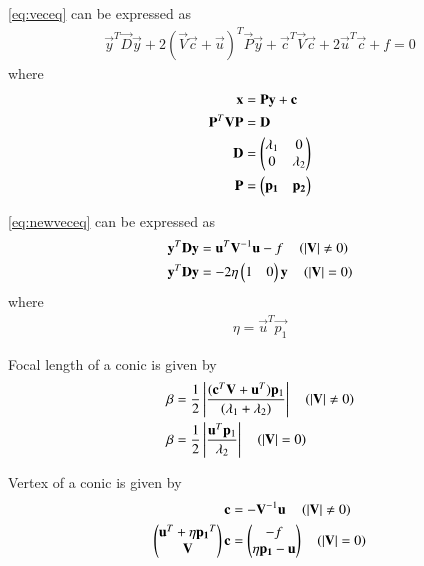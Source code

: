 \documentclass[journal,12pt,twocolumn]{IEEEtran}
\begin{document}
\begin{lemma}
\eqref{eq:veceq} can be expressed as 
\begin{align}
    \vec{y}^T\vec{D}\vec{y} + 2(\vec{V}\vec{c} + \vec{u})^T \vec{P}\vec{y} + \vec{c}^T\vec{V}\vec{c} + 2\vec{u}^T\vec{c} + f = 0 \label{eq:newveceq}
\end{align}
where
\begin{align}
    \mathbf{x} &= \mathbf{P}\mathbf{y}+\mathbf{c} \\
    \mathbf{P}^T\mathbf{V}\mathbf{P} &= \mathbf{D} \\
    \mathbf{D} &= \begin{pmatrix}\lambda_1 & 0 \\ 0 & \lambda_2\end{pmatrix}\\
    \mathbf{P} &= \begin{pmatrix}\mathbf{p_1} & \mathbf{p_2}\end{pmatrix}
\end{align}
\end{lemma}

\begin{lemma}
\eqref{eq:newveceq} can be expressed as 
\begin{align}
 \mathbf{y}^T\mathbf{D}\mathbf{y} &= \mathbf{u}^T\mathbf{V}^{-1}\mathbf{u} - f \quad \left(\left\vert\mathbf{V}\right\vert \neq 0\right) \label{eq:stdvecneq}
 \\
\mathbf{y}^T\mathbf{D}\mathbf{y} &= -2\eta\begin{pmatrix}1 & 0\end{pmatrix}\mathbf{y} \quad \left(\left\vert\mathbf{V}\right\vert = 0\right) \label{eq:stdveceq}
\end{align} 
where
\begin{align}
    \eta = \vec{u}^T\vec{p_1}
\end{align}
\end{lemma}

\begin{lemma}
Focal length of a conic is given by
\begin{align}
\beta &= \frac{1}{2}\left\vert\frac{(\mathbf{c}^T\mathbf{V}+\mathbf{u}^T)\mathbf{p}_1}{(\lambda_1+\lambda_2)}\right\vert \quad \left(\left\vert\mathbf{V}\right\vert \neq 0\right) \label{eq:foclenneq}
\\
\beta &= \frac{1}{2}\left\vert\frac{\mathbf{u}^T\mathbf{p}_1}{\lambda_2}\right\vert \quad \left(\left\vert\mathbf{V}\right\vert = 0\right) \label{eq:foclen} \end{align}
\end{lemma}

\begin{lemma}
Vertex of a conic is given by 
\begin{align}
\mathbf{c} &= -\mathbf{V}^{-1}\mathbf{u} \quad \left(\left\vert\mathbf{V}\right\vert \neq 0\right) \label{eq:vertexneq}
\\
\begin{pmatrix}\mathbf{u}^T + \eta\mathbf{p_1}^T \\ \mathbf{V}\end{pmatrix}\mathbf{c} &= \begin{pmatrix}-f \\ \eta\mathbf{p_1} - \mathbf{u}\end{pmatrix} \quad \left(\left\vert\mathbf{V}\right\vert = 0\right) \label{eq:vertex}
\end{align}
\end{lemma}
\end{document}
